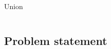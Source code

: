 \begin{frame}
\begin{center}
\begin{columns}[c]
\begin{center}
					Union
				\end{center}
			\end{columns}
		\end{center}			
		
		\end{frame}
		

	\subsection[Problem]{Problem statement}
